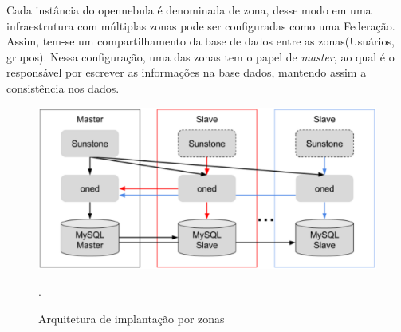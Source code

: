 Cada instância do opennebula é denominada de zona, desse modo em uma infraestrutura com múltiplas zonas pode ser configuradas como uma Federação. Assim, tem-se um compartilhamento da base de dados entre as zonas(Usuários, grupos). Nessa configuração, uma das zonas tem o papel de \textit{master}, ao qual é o responsável por escrever as informações na base dados, mantendo assim a consistência nos dados\cite{opennebula}.

\begin{figure}[!htb]
\centering
\includegraphics [keepaspectratio=true,scale=0.60]{figuras/opennebula_zone.eps}
\caption{Arquitetura de implantação por zonas}
\cite{opennebula}.
\label{opennebulafederation}
\end{figure}



